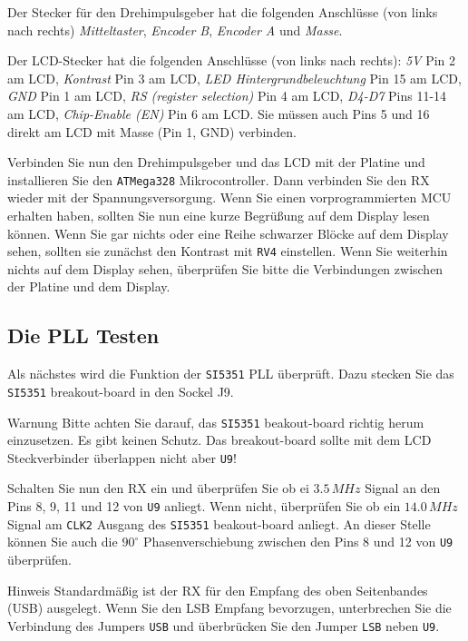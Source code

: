 \documentclass[10pt, a4paper,twoside]{scrartcl}
\newenvironment{remark}{\begin{bclogo}[couleur=blue!30,arrondi=.1,logo=\bcinfo,ombre=true]{Hinweis}}{\end{bclogo}}
\newenvironment{warning}{\begin{bclogo}[couleur=red!30,arrondi=.1,logo=\bcattention,ombre=true]{Warnung}}{\end{bclogo}}
\begin{document}
 Der Stecker für den Drehimpulsgeber hat die folgenden Anschlüsse (von links nach rechts) \emph{Mitteltaster}, \emph{Encoder B}, \emph{Encoder A} und \emph{Masse}.

 Der LCD-Stecker hat die folgenden Anschlüsse (von links nach rechts): \emph{5V} Pin 2 am LCD, \emph{Kontrast} Pin 3 am LCD, \emph{LED Hintergrundbeleuchtung} Pin 15 am LCD, \emph{GND} Pin 1 am LCD, \emph{RS (register selection)} Pin 4 am LCD, \emph{D4-D7} Pins 11-14 am LCD, \emph{Chip-Enable (EN)} Pin 6 am LCD. Sie müssen auch Pins 5 und 16 direkt am LCD mit Masse (Pin 1, GND) verbinden.
 
 Verbinden Sie nun den Drehimpulsgeber und das LCD mit der Platine und installieren Sie den \texttt{ATMega328} Mikrocontroller. Dann verbinden Sie den RX wieder mit der Spannungsversorgung. Wenn Sie einen vorprogrammierten MCU erhalten haben, sollten Sie nun eine kurze Begrüßung auf dem Display lesen können. Wenn Sie gar nichts oder eine Reihe schwarzer Blöcke auf dem Display sehen, sollten sie zunächst den Kontrast mit \texttt{RV4} einstellen. Wenn Sie weiterhin nichts auf dem Display sehen, überprüfen Sie bitte die Verbindungen zwischen der Platine und dem Display.

\subsection{Die PLL Testen}
 Als nächstes wird die Funktion der \texttt{SI5351} PLL überprüft. Dazu stecken Sie das \texttt{SI5351} breakout-board in den Sockel J9.

\begin{warning}
 Bitte achten Sie darauf, das \texttt{SI5351} beakout-board richtig herum einzusetzen. Es gibt keinen Schutz. Das breakout-board sollte mit dem LCD Steckverbinder überlappen nicht aber \texttt{U9}!
\end{warning}
 
 Schalten Sie nun den RX ein und überprüfen Sie ob ei $3.5\,MHz$ Signal an den Pins 8, 9, 11 und 12 von \texttt{U9} anliegt. Wenn nicht, überprüfen Sie ob ein $14.0\,MHz$ Signal am \texttt{CLK2} Ausgang des \texttt{SI5351} beakout-board anliegt. An dieser Stelle können Sie auch die $90^\circ$ Phasenverschiebung zwischen den Pins 8 und 12 von \texttt{U9} überprüfen.

\begin{remark}
Standardmäßig ist der RX für den Empfang des oben Seitenbandes (USB) ausgelegt. Wenn Sie den LSB Empfang bevorzugen, unterbrechen Sie die Verbindung des Jumpers \texttt{USB} und überbrücken Sie den Jumper \texttt{LSB} neben \texttt{U9}.
\end{remark} 
\end{document}
